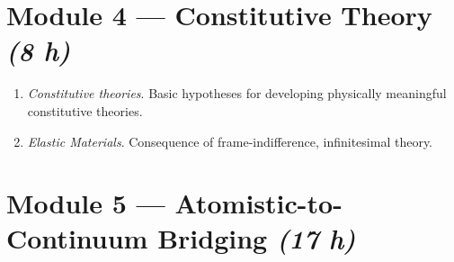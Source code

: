 \documentclass[11pt,a4paper]{scrartcl}
\begin{document}
	
	\section{Module 4 --- Constitutive Theory \normalfont\normalsize\itshape (8 h)}

\begin{enumerate}
	\item \textit{Constitutive theories}.   Basic hypotheses for developing physically meaningful constitutive theories.
	\item \textit{Elastic Materials}. Consequence of frame-indifference, infinitesimal theory.
\end{enumerate}	


	
\section{Module 5 --- Atomistic-to-Continuum Bridging \normalfont\normalsize\itshape (17 h)}
\end{document}
